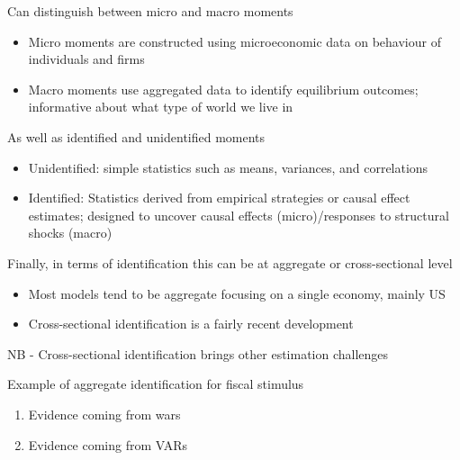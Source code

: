 \documentclass{beamer}
\begin{document}
\begin{frame}
 Can distinguish between micro and macro moments
 \begin{itemize}
   \item Micro moments are constructed using microeconomic data on behaviour of individuals and firms
   \item Macro moments use aggregated data to identify equilibrium outcomes; informative about what type of world we live in
 \end{itemize}
\end{frame}

\begin{frame}
  As well as identified and unidentified moments
  \begin{itemize}
    \item Unidentified: simple statistics such as means, variances, and correlations
    \item Identified: Statistics derived from empirical strategies or causal effect estimates; designed to uncover causal effects (micro)/responses to structural shocks (macro)
  \end{itemize}
\end{frame}

\begin{frame}
 Finally, in terms of identification this can be at aggregate or cross-sectional level
 \begin{itemize}
   \item Most models tend to be aggregate focusing on a single economy, mainly US
   \item Cross-sectional identification is a fairly recent development
 \end{itemize}
 NB - Cross-sectional identification brings other estimation challenges
\end{frame}

\begin{frame}
  Example of aggregate identification for fiscal stimulus
  \begin{enumerate}
    \item Evidence coming from wars
    \item Evidence coming from VARs
  \end{enumerate}
\end{frame}

\begin{frame}
  

\end{frame}
\end{document}
